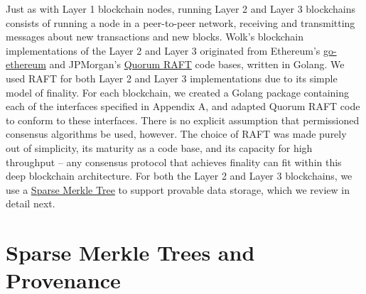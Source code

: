 \documentclass{article}
\begin{document}
\noindent Just as with Layer 1 blockchain nodes, running Layer 2 and Layer 3 blockchains consists of running a node in a peer-to-peer network, receiving and transmitting messages about new transactions and new blocks.   Wolk's blockchain implementations of the Layer 2 and Layer 3 originated from Ethereum's \href{https://github.com/ethereum/go-ethereum}{go-ethereum} and JPMorgan's \href{https://github.com/jpmorganchase/quorum}{Quorum RAFT} code bases, written in Golang.  We used RAFT for both Layer 2 and Layer 3 implementations due to its simple model of finality.  For each blockchain, we created a Golang package containing each of the interfaces specified in Appendix A, and adapted Quorum RAFT code to conform to these interfaces.  There is no explicit assumption that  permissioned consensus algorithms be used, however.   The choice of RAFT was made purely out of simplicity, its maturity as a code base, and its capacity for high throughput -- any consensus protocol that achieves finality can fit within this deep blockchain architecture.  For both the Layer 2 and Layer 3 blockchains, we use a \href{https://github.com/wolkdb/deepblockchains/smt}{Sparse Merkle Tree} to support provable data storage, which we review in detail next.

\section{Sparse Merkle Trees and Provenance}
\end{document}
